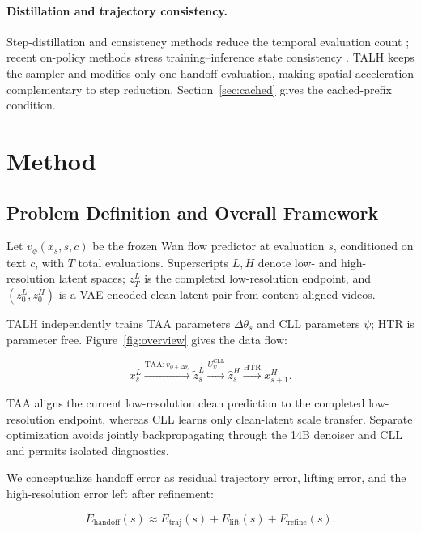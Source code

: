 \paragraph{Distillation and trajectory consistency.}
Step-distillation and consistency methods reduce the temporal evaluation count \citep{salimans2022progressive,song2023consistency,luo2023lcm,yin2024dmd,yin2024dmd2,wang2023videolcm,zhai2024mcm}; recent on-policy methods stress training--inference state consistency \citep{huang2025selfforcing,jiang2026dopsd,gu2026anyflow}. TALH keeps the sampler and modifies only one handoff evaluation, making spatial acceleration complementary to step reduction. Section~\ref{sec:cached} gives the cached-prefix condition.

\section{Method}

\subsection{Problem Definition and Overall Framework}

Let \(v_\phi(x_s,s,c)\) be the frozen Wan flow predictor at evaluation \(s\), conditioned on text \(c\), with \(T\) total evaluations. Superscripts \(L,H\) denote low- and high-resolution latent spaces; \(z_T^L\) is the completed low-resolution endpoint, and \((z_0^L,z_0^H)\) is a VAE-encoded clean-latent pair from content-aligned videos.

TALH independently trains TAA parameters \(\Delta\theta_s\) and CLL parameters \(\psi\); HTR is parameter free. Figure~\ref{fig:overview} gives the data flow:

\[
x_s^L \xrightarrow{\mathrm{TAA}:v_{\phi+\Delta\theta_s}}
\widetilde z_s^L \xrightarrow{U_\psi^{\mathrm{CLL}}}
\widehat z_s^H \xrightarrow{\mathrm{HTR}} x_{s+1}^H.
\]

TAA aligns the current low-resolution clean prediction to the completed low-resolution endpoint, whereas CLL learns only clean-latent scale transfer. Separate optimization avoids jointly backpropagating through the 14B denoiser and CLL and permits isolated diagnostics.

We conceptualize handoff error as residual trajectory error, lifting error, and the high-resolution error left after refinement:

\[
E_{\mathrm{handoff}}(s) \approx E_{\mathrm{traj}}(s)
+ E_{\mathrm{lift}}(s) + E_{\mathrm{refine}}(s).
\]

